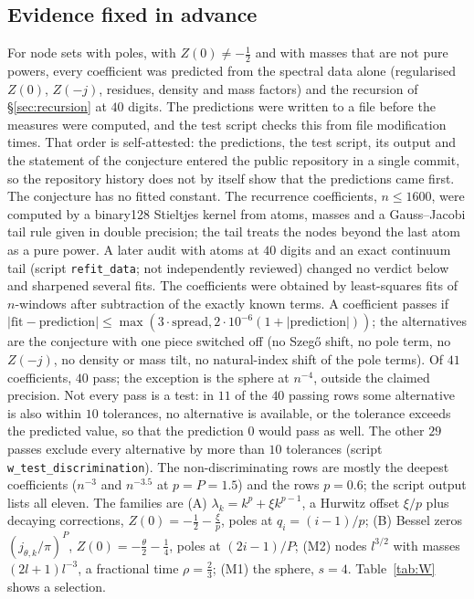 \subsection{Evidence fixed in advance}\label{sec:evidence}
For node sets with poles, with $Z(0)\ne-\frac12$ and with masses that are not pure powers, every coefficient was predicted from the spectral data
alone (regularised $Z(0)$, $Z(-j)$, residues, density and mass factors) and the recursion of \S\ref{sec:recursion} at $40$ digits. The
predictions were written to a file before the measures were computed, and the test script checks this from file modification times. That order
is self-attested: the predictions, the test script, its output and the statement of the conjecture entered the public repository in a single
commit, so the repository history does not by itself show that the predictions came first. The conjecture has no fitted constant. The
recurrence coefficients, $n\le1600$, were computed by a binary128 Stieltjes kernel from atoms, masses and a Gauss--Jacobi tail rule given in
double precision; the tail treats the nodes beyond the last atom as a pure power. A later audit with atoms at $40$ digits and an exact
continuum tail (script \texttt{refit\_data}; not independently reviewed) changed no verdict below and sharpened several fits. The
coefficients were obtained by least-squares fits of $n$-windows after subtraction of the exactly known terms. A coefficient passes if
$|\text{fit}-\text{prediction}|\le\max(3\cdot\text{spread},2\cdot10^{-6}(1+|\text{prediction}|))$; the alternatives are the conjecture with one
piece switched off (no Szeg\H{o} shift, no pole term, no $Z(-j)$, no density or mass tilt, no natural-index shift of the pole terms). Of $41$
coefficients, $40$ pass; the exception is the sphere at $n^{-4}$, outside the claimed precision. Not every pass is a test: in $11$ of the $40$
passing rows some alternative is also within $10$ tolerances, no alternative is available, or the tolerance exceeds the predicted value, so
that the prediction $0$ would pass as well. The other $29$ passes exclude every alternative by more than $10$ tolerances (script
\texttt{w\_test\_discrimination}). The non-discriminating rows are mostly the deepest coefficients ($n^{-3}$ and $n^{-3.5}$ at $p=P=1.5$) and
the rows $p=0.6$; the script output lists all eleven. The families are (A) $\lambda_k=k^p+\xi k^{p-1}$, a
Hurwitz offset $\xi/p$ plus decaying corrections, $Z(0)=-\frac12-\frac\xi p$, poles at $q_i=(i-1)/p$; (B) Bessel zeros $(j_{\theta,k}/\pi)^P$,
$Z(0)=-\frac\theta2-\frac14$, poles at $(2i-1)/P$; (M2) nodes $l^{3/2}$ with masses $(2l+1)l^{-3}$, a fractional time $\rho=\frac23$; (M1) the sphere,
$s=4$. Table~\ref{tab:W} shows a selection.

